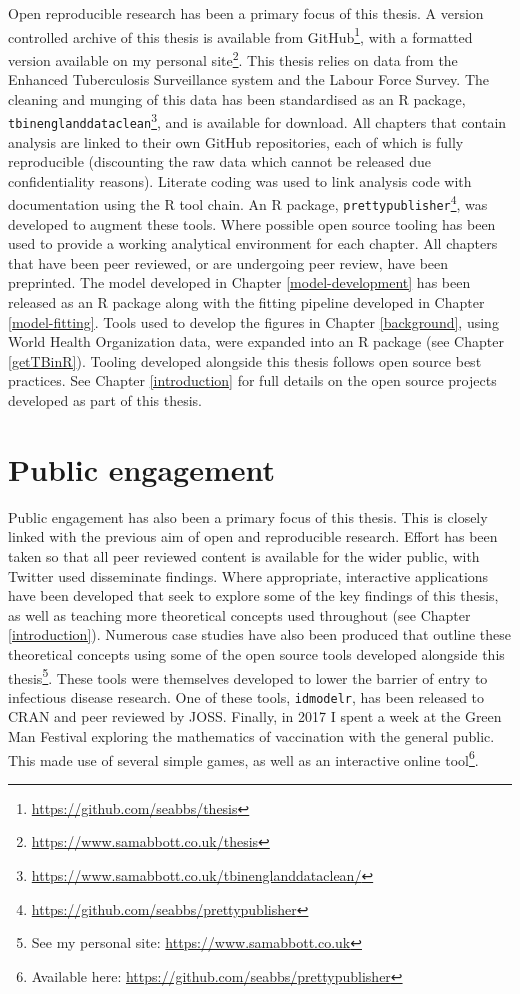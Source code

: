 \documentclass[11pt,twoside]{bristolthesis}
\begin{document}
  Open reproducible research has been a primary focus of this thesis. A version controlled archive of this thesis is available from GitHub\footnote{\url{https://github.com/seabbs/thesis}}, with a formatted version available on my personal site\footnote{\url{https://www.samabbott.co.uk/thesis}}. This thesis relies on data from the Enhanced Tuberculosis Surveillance system and the Labour Force Survey. The cleaning and munging of this data has been standardised as an R package, \texttt{tbinenglanddataclean}\footnote{\url{https://www.samabbott.co.uk/tbinenglanddataclean/}}, and is available for download. All chapters that contain analysis are linked to their own GitHub repositories, each of which is fully reproducible (discounting the raw data which cannot be released due confidentiality reasons). Literate coding was used to link analysis code with documentation using the R tool chain. An R package, \texttt{prettypublisher}\footnote{\url{https://github.com/seabbs/prettypublisher}}, was developed to augment these tools. Where possible open source tooling has been used to provide a working analytical environment for each chapter. All chapters that have been peer reviewed, or are undergoing peer review, have been preprinted. The model developed in Chapter \ref{model-development} has been released as an R package along with the fitting pipeline developed in Chapter \ref{model-fitting}. Tools used to develop the figures in Chapter \ref{background}, using World Health Organization data, were expanded into an R package (see Chapter \ref{getTBinR}). Tooling developed alongside this thesis follows open source best practices. See Chapter \ref{introduction} for full details on the open source projects developed as part of this thesis.
  
  \hypertarget{public-engagement}{%
  \section{Public engagement}\label{public-engagement}}
  
  Public engagement has also been a primary focus of this thesis. This is closely linked with the previous aim of open and reproducible research. Effort has been taken so that all peer reviewed content is available for the wider public, with Twitter used disseminate findings. Where appropriate, interactive applications have been developed that seek to explore some of the key findings of this thesis, as well as teaching more theoretical concepts used throughout (see Chapter \ref{introduction}). Numerous case studies have also been produced that outline these theoretical concepts using some of the open source tools developed alongside this thesis\footnote{See my personal site: \url{https://www.samabbott.co.uk}}. These tools were themselves developed to lower the barrier of entry to infectious disease research. One of these tools, \texttt{idmodelr}, has been released to CRAN and peer reviewed by JOSS. Finally, in 2017 I spent a week at the Green Man Festival exploring the mathematics of vaccination with the general public. This made use of several simple games, as well as an interactive online tool\footnote{Available here: \url{https://github.com/seabbs/prettypublisher}}.
  
\end{document}

